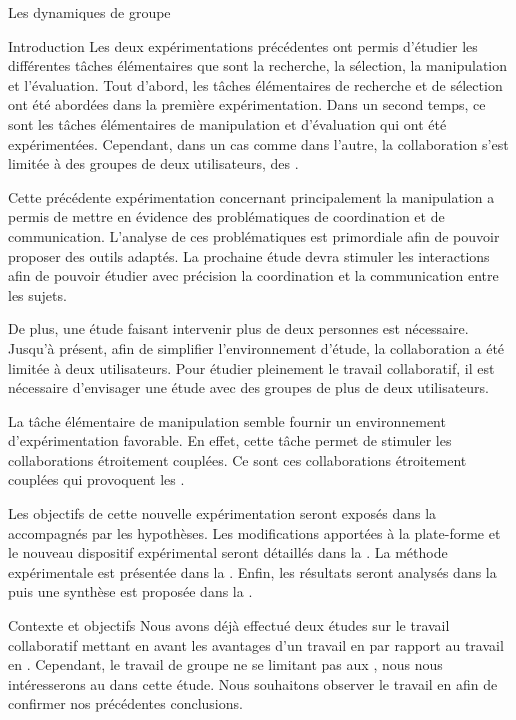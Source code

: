 \documentclass[myfrancais]{mythesis}
\begin{document}
	\begin{mychapter}{Les dynamiques de groupe}
		\begin{mysection}{Introduction}
			Les deux expérimentations précédentes ont permis d'étudier les différentes tâches élémentaires que sont la recherche, la sélection, la manipulation et l'évaluation.
			Tout d'abord, les tâches élémentaires de recherche et de sélection ont été abordées dans la première expérimentation.
			Dans un second temps, ce sont les tâches élémentaires de manipulation et d'évaluation qui ont été expérimentées.
			Cependant, dans un cas comme dans l'autre, la collaboration s'est limitée à des groupes de deux utilisateurs, des .

			Cette précédente expérimentation concernant principalement la manipulation a permis de mettre en évidence des problématiques de coordination et de communication.
			L'analyse de ces problématiques est primordiale afin de pouvoir proposer des outils adaptés.
			La prochaine étude devra stimuler les interactions afin de pouvoir étudier avec précision la coordination et la communication entre les sujets.

			De plus, une étude faisant intervenir plus de deux personnes est nécessaire.
			Jusqu'à présent, afin de simplifier l'environnement d'étude, la collaboration a été limitée à deux utilisateurs.
			Pour étudier pleinement le travail collaboratif, il est nécessaire d'envisager une étude avec des groupes de plus de deux utilisateurs.

			La tâche élémentaire de manipulation semble fournir un environnement d'expérimentation favorable.
			En effet, cette tâche permet de stimuler les collaborations étroitement couplées.
			Ce sont ces collaborations étroitement couplées qui provoquent les .

			Les objectifs de cette nouvelle expérimentation seront exposés dans la  accompagnés par les hypothèses.
			Les modifications apportées à la plate-forme et le nouveau dispositif expérimental seront détaillés dans la .
			La méthode expérimentale est présentée dans la .
			Enfin, les résultats seront analysés dans la  puis une synthèse est proposée dans la .
		\end{mysection}
		\begin{mysection}{Contexte et objectifs}
			Nous avons déjà effectué deux études sur le travail collaboratif mettant en avant les avantages d'un travail en  par rapport au travail en .
			Cependant, le travail de groupe ne se limitant pas aux , nous nous intéresserons au  dans cette étude.
			Nous souhaitons observer le travail en  afin de confirmer nos précédentes conclusions.


\end{mysection}
\end{mychapter}
\end{document}
